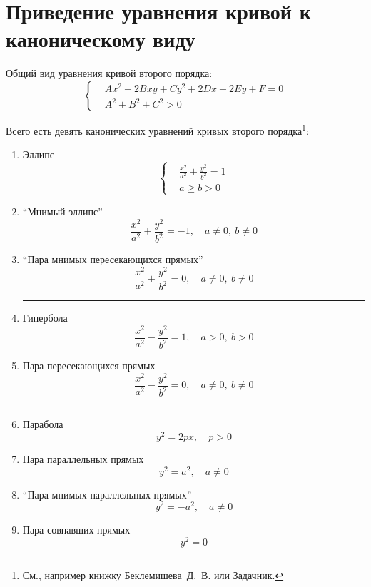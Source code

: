 \documentclass[a4paper,12pt]{article}
\begin{document}
  \section{Приведение уравнения кривой к каноническому виду}
  
  Общий вид уравнения кривой второго порядка:
  \begin{equation}\label{eq:second-order-curve}
    \left\{
      \begin{aligned}
        &Ax^2 + 2B xy + Cy^2 + 2Dx + 2Ey + F = 0\\
        &A^2 + B^2 + C^2 > 0
      \end{aligned}
    \right.
  \end{equation}
  
  Всего есть девять канонических уравнений кривых второго порядка\footnote{См., например книжку Беклемишева~Д.~В. или Задачник.}:
  
  \begin{enumerate}
    \item\label{enum:ellipse} Эллипс
      \[
        \left\{
          \begin{aligned}
            &\frac{x^2}{a^2} + \frac{y^2}{b^2} = 1\\
            &a \geq b > 0
          \end{aligned}
        \right.
      \]
    \item ``Мнимый эллипс''
      \[
        \frac{x^2}{a^2} + \frac{y^2}{b^2} = -1,\quad a \not= 0,\ b \not= 0
      \]
    \item ``Пара мнимых пересекающихся прямых''
      \[
        \frac{x^2}{a^2} + \frac{y^2}{b^2} = 0,\quad a \not= 0,\ b \not= 0
      \]
    
    \noindent\textcolor{my-grey}{\rule{0.8\textwidth}{1pt}}

    \item\label{enum:hyperbola} Гипербола
      \[
        \frac{x^2}{a^2} - \frac{y^2}{b^2} = 1,\quad a > 0,\ b > 0
      \]
    \item Пара пересекающихся прямых
      \[
        \frac{x^2}{a^2} - \frac{y^2}{b^2} = 0,\quad a \not= 0,\ b \not= 0
      \]
    
    \noindent\textcolor{my-grey}{\rule{0.8\textwidth}{1pt}}
    
    \item\label{enum:parabola} Парабола
      \[
        y^2 = 2px, \quad p > 0
      \]
    \item Пара параллельных прямых
      \[
        y^2 = a^2,\quad a \not= 0
      \]
    \item ``Пара мнимых параллельных прямых''
      \[
        y^2 = -a^2,\quad a \not= 0
      \]
    \item Пара совпавших прямых
      \[
        y^2 = 0
      \]
  \end{enumerate}
  
\end{document}
